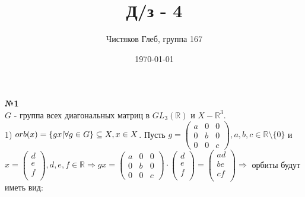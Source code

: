 \documentclass[a4paper, 12pt]{article}
\title{Д/з - 4}
\author{Чистяков Глеб, группа 167}
\date{\today}
\begin{document}
	
	\maketitle
	
	\textbf{№1} \\
	
	$G$ - группа всех диагональных матриц в $GL_3(\mathbb R)$ и $X - \mathbb R^3$. \\
	1) $orb(x) = \{gx \arrowvert \forall g \in G\} \subseteq X, x \in X$. Пусть 
	$g = \begin{pmatrix}
			a & 0 & 0\\
			0 & b & 0\\
			0 & 0 & c  
	\end{pmatrix}, a, b, c \in \mathbb R \setminus \{0\}$ и 
	$x = \begin{pmatrix} d \\ e \\ f \\ \end{pmatrix}, d, e, f \in \mathbb R \Rightarrow 
	gx = \begin{pmatrix}
	a & 0 & 0\\
	0 & b & 0\\
	0 & 0 & c  
	\end{pmatrix} \cdot
	\begin{pmatrix} d \\ e \\ f \\ \end{pmatrix} = 
	\begin{pmatrix}	ad \\ be \\ cf \\ \end{pmatrix} \Rightarrow$ орбиты будут иметь вид: \\
	
\end{document}
